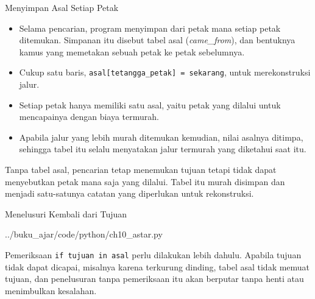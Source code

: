 \documentclass[aspectratio=169,10pt]{beamer}
\begin{document}
\begin{frame}{Menyimpan Asal Setiap Petak}
\begin{itemize}
  \item Selama pencarian, program menyimpan dari petak mana setiap petak
        ditemukan. Simpanan itu disebut tabel asal
        (\emph{came\_from}), dan bentuknya kamus yang memetakan sebuah petak
        ke petak sebelumnya.
  \item Cukup satu baris, \texttt{asal[tetangga\_petak] = sekarang}, untuk
        merekonstruksi jalur.
  \item Setiap petak hanya memiliki satu asal, yaitu petak yang dilalui untuk
        mencapainya dengan biaya termurah.
  \item Apabila jalur yang lebih murah ditemukan kemudian, nilai asalnya
        ditimpa, sehingga tabel itu selalu menyatakan jalur termurah yang
        diketahui saat itu.
\end{itemize}
\vspace{0.12cm}
\begin{kotak}
Tanpa tabel asal, pencarian tetap menemukan tujuan tetapi tidak dapat
menyebutkan petak mana saja yang dilalui. Tabel itu murah disimpan dan menjadi
satu-satunya catatan yang diperlukan untuk rekonstruksi.
\end{kotak}
\end{frame}

\begin{frame}[fragile]{Menelusuri Kembali dari Tujuan}

  {../buku_ajar/code/python/ch10_astar.py}
\begin{peringatan}
Pemeriksaan \texttt{if tujuan in asal} perlu dilakukan lebih dahulu. Apabila
tujuan tidak dapat dicapai, misalnya karena terkurung dinding, tabel asal
tidak memuat tujuan, dan penelusuran tanpa pemeriksaan itu akan berputar tanpa
henti atau menimbulkan kesalahan.
\end{peringatan}
\end{frame}
\end{document}
